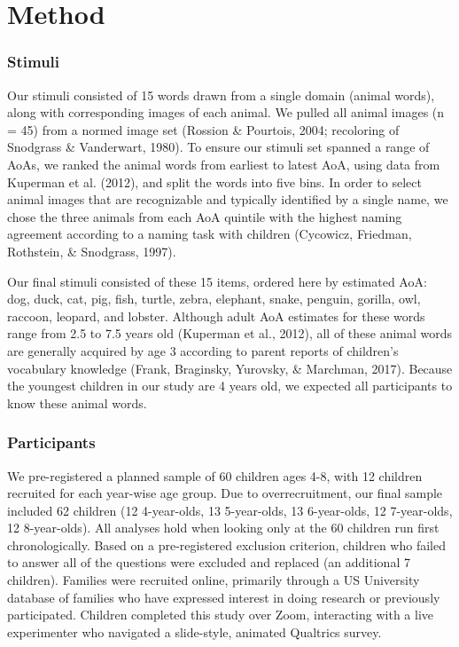 \documentclass[10pt, letterpaper]{article}
\begin{document}
\hypertarget{method}{%
\section{Method}\label{method}}

\hypertarget{stimuli}{%
\subsubsection{Stimuli}\label{stimuli}}

Our stimuli consisted of 15 words drawn from a single domain (animal
words), along with corresponding images of each animal. We pulled all
animal images (n = 45) from a normed image set (Rossion \& Pourtois,
2004; recoloring of Snodgrass \& Vanderwart, 1980). To ensure our
stimuli set spanned a range of AoAs, we ranked the animal words from
earliest to latest AoA, using data from Kuperman et al. (2012), and
split the words into five bins. In order to select animal images that
are recognizable and typically identified by a single name, we chose the
three animals from each AoA quintile with the highest naming agreement
according to a naming task with children (Cycowicz, Friedman, Rothstein,
\& Snodgrass, 1997).

Our final stimuli consisted of these 15 items, ordered here by estimated
AoA: dog, duck, cat, pig, fish, turtle, zebra, elephant, snake, penguin,
gorilla, owl, raccoon, leopard, and lobster. Although adult AoA
estimates for these words range from 2.5 to 7.5 years old (Kuperman et
al., 2012), all of these animal words are generally acquired by age 3
according to parent reports of children's vocabulary knowledge (Frank,
Braginsky, Yurovsky, \& Marchman, 2017). Because the youngest children
in our study are 4 years old, we expected all participants to know these
animal words.

\hypertarget{participants}{%
\subsubsection{Participants}\label{participants}}

We pre-registered a planned sample of 60 children ages 4-8, with 12
children recruited for each year-wise age group. Due to overrecruitment,
our final sample included 62 children (12 4-year-olds, 13 5-year-olds,
13 6-year-olds, 12 7-year-olds, 12 8-year-olds). All analyses hold when
looking only at the 60 children run first chronologically. Based on a
pre-registered exclusion criterion, children who failed to answer all of
the questions were excluded and replaced (an additional 7 children).
Families were recruited online, primarily through a US University
database of families who have expressed interest in doing research or
previously participated. Children completed this study over Zoom,
interacting with a live experimenter who navigated a slide-style,
animated Qualtrics survey.
\end{document}
